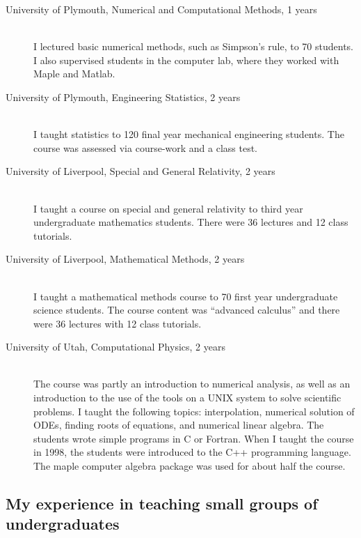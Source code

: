 \documentclass[12pt]{article}
\begin{document}
\begin{description}
  \item[University of Plymouth, Numerical and Computational Methods,
1 years] \hfill \\
I lectured basic numerical methods,
such as Simpson's rule,
 to 70 students. I also supervised
students in the computer lab, where they worked with Maple
and Matlab.

  \item[University of Plymouth, Engineering Statistics,
2 years] \hfill \\
I taught statistics to 120 final year mechanical engineering 
students. The course was assessed via course-work and a class 
test.

  \item[University of Liverpool, Special and General
Relativity,
2 years] \hfill \\
I taught a course on special and general
relativity to third year undergraduate mathematics students. 
There were 36 lectures and 12 class tutorials.

  \item[University of Liverpool, Mathematical Methods, 2 years] \hfill \\
I taught a mathematical methods course
 to 70 first year undergraduate science students.  The course
content was ``advanced calculus'' and there were 36 lectures 
with 12 class tutorials.


\item[University of Utah, Computational Physics, 2 years] \hfill \\
The course was partly an introduction to numerical
analysis, as well as an introduction to the use of the tools on a UNIX
system to solve scientific problems.  I taught the following topics:
interpolation, numerical solution of ODEs, finding roots of
equations, and numerical linear algebra.  The students wrote simple
programs in C or Fortran. When I taught the course in 1998, the
students were introduced to the C++ programming language. The maple
computer algebra package was used for about half the course.


\end{description}

\subsection{My experience in teaching small groups of undergraduates}
\end{document}
